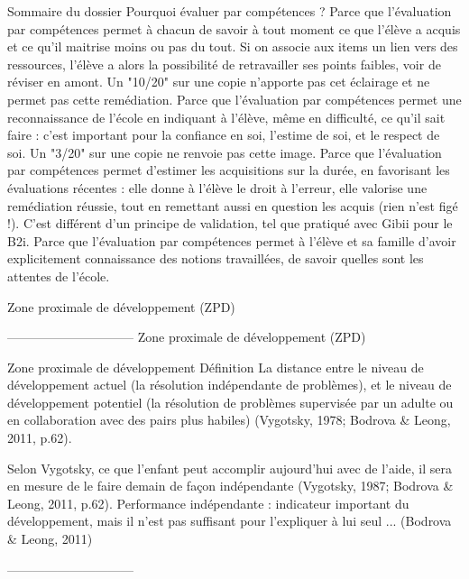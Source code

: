  Sommaire du dossier
Pourquoi évaluer par compétences ?
Parce que l'évaluation par compétences permet à chacun de savoir à tout moment ce que l'élève a acquis et ce qu'il maitrise moins ou pas du tout. Si on associe aux items un lien vers des ressources, l'élève a alors la possibilité de retravailler ses points faibles, voir de réviser en amont. Un "10/20" sur une copie n'apporte pas cet éclairage et ne permet pas cette remédiation.
Parce que l'évaluation par compétences permet une reconnaissance de l'école en indiquant à l'élève, même en difficulté, ce qu'il sait faire : c'est important pour la confiance en soi, l'estime de soi, et le respect de soi. Un "3/20" sur une copie ne renvoie pas cette image.
Parce que l'évaluation par compétences permet d'estimer les acquisitions sur la durée, en favorisant les évaluations récentes : elle donne à l'élève le droit à l'erreur, elle valorise une remédiation réussie, tout en remettant aussi en question les acquis (rien n'est figé !). C'est différent d'un principe de validation, tel que pratiqué avec Gibii pour le B2i.
Parce que l'évaluation par compétences permet à l'élève et sa famille d'avoir explicitement connaissance des notions travaillées, de savoir quelles sont les attentes de l'école.


Zone proximale de développement (ZPD) 

------------------------------
Zone proximale de développement (ZPD) 


Zone proximale de développement
 Définition  
 \og La distance entre le niveau de développement actuel (la résolution indépendante de problèmes), et le niveau de développement potentiel (la résolution de problèmes supervisée par un adulte ou en collaboration avec des pairs plus habiles) \fg
  (Vygotsky, 1978; Bodrova \& Leong, 2011, p.62).

 \og Selon Vygotsky, ce que l'enfant peut accomplir aujourd'hui avec de l'aide, il sera en mesure de le faire demain de façon indépendante \fg{} 
 (Vygotsky, 1987; Bodrova \& Leong, 2011, p.62).
 Performance indépendante : indicateur important du développement, mais il n'est pas suffisant pour l'expliquer à lui seul ...               (Bodrova \& Leong, 2011)


------------------------------


 